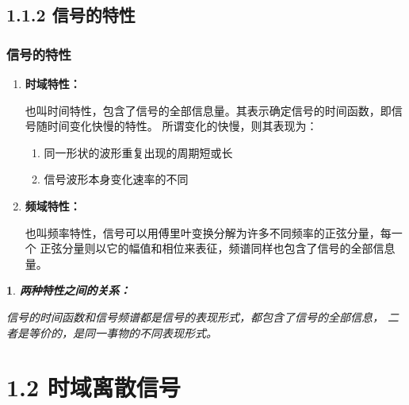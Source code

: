 \documentclass[notheorems,compress,mathserif,table]{beamer}
\newtheorem{dablock}{}
\begin{document}
\subsection{1.1.2 信号的特性}

\begin{frame}\frametitle{信号的特性}%
\begin{enumerate}
  \item \textbf{时域特性：}
      \par\qquad 也叫时间特性，包含了信号的全部信息量。其表示确定信号的时间函数，即信号随时间变化快慢的特性。
      所谓变化的快慢，则其表现为：
      \begin{enumerate}
        \item 同一形状的波形重复出现的周期短或长
        \item 信号波形本身变化速率的不同
      \end{enumerate}
  \item
      \textbf{频域特性：}
      \par\qquad 也叫频率特性，信号可以用傅里叶变换分解为许多不同频率的正弦分量，每一个
      正弦分量则以它的幅值和相位来表征，频谱同样也包含了信号的全部信息量。
\end{enumerate}
\begin{dablock}
      \textbf{两种特性之间的关系：}
      \par \quad\quad 信号的时间函数和信号频谱都是信号的表现形式，都包含了信号的全部信息，
      二者是等价的，是同一事物的不同表现形式。
\end{dablock}
\end{frame}
\section{1.2 时域离散信号}
\end{document}
